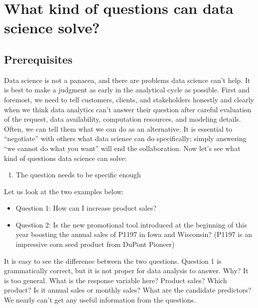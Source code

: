 \documentclass[12pt,]{krantz}
\providecommand{\tightlist}{%
  \setlength{\itemsep}{0pt}\setlength{\parskip}{0pt}}
\begin{document}
\hypertarget{what-kind-of-questions-can-data-science-solve}{%
\section{What kind of questions can data science solve?}\label{what-kind-of-questions-can-data-science-solve}}

\hypertarget{prerequisites}{%
\subsection{Prerequisites}\label{prerequisites}}

Data science is not a panacea, and there are problems data science can't help. It is best to make a judgment as early in the analytical cycle as possible. First and foremost, we need to tell customers, clients, and stakeholders honestly and clearly when we think data analytics can't answer their question after careful evaluation of the request, data availability, computation resources, and modeling details. Often, we can tell them what we can do as an alternative. It is essential to ``negotiate'' with others what data science can do specifically; simply answering ``we cannot do what you want'' will end the collaboration. Now let's see what kind of questions data science can solve:

\begin{enumerate}
\def\labelenumi{\arabic{enumi}.}
\tightlist
\item
  The question needs to be specific enough
\end{enumerate}

Let us look at the two examples below:

\begin{itemize}
\tightlist
\item
  Question 1: How can I increase product sales?
\item
  Question 2: Is the new promotional tool introduced at the beginning of this year boosting the annual sales of P1197 in Iowa and Wisconsin? (P1197 is an impressive corn seed product from DuPont Pioneer)
\end{itemize}

It is easy to see the difference between the two questions. Question 1 is grammatically correct, but it is not proper for data analysis to answer. Why? It is too general. What is the response variable here? Product sales? Which product? Is it annual sales or monthly sales? What are the candidate predictors? We nearly can't get any useful information from the questions.
\end{document}
